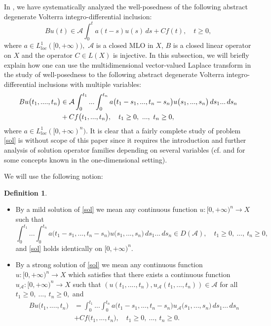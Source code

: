 \documentclass{amsart}
\theoremstyle{definition}
\newtheorem{defn}[thm]{Definition}
\theoremstyle{remark}
\numberwithin{equation}{section}
\begin{document}
In \cite[Chapter 3]{FKP}, we have systematically analyzed the well-posedness of the following abstract degenerate Volterra integro-differential inclusion:
$$
Bu(t)\in {\mathcal A}\int^{t}_{0}a(t-s)u(s)\, ds+Cf(t),\quad t\geq 0,
$$
where $a\in L_{loc}^{1}([0,+\infty)),$ ${\mathcal A}$ is a closed MLO in $X$, $B$ is a closed linear operator on $X$ and the operator $C\in L(X)$ is injective. In this subsection, we will briefly explain how one can use the multidimensional vector-valued Laplace transform in the study of well-posedness to the following abstract degenerate Volterra integro-differential inclusions with multiple variables:
\begin{align}\notag
Bu\bigl(t_{1},....,t_{n}\bigr)&\in {\mathcal A}\int^{t_{1}}_{0}...\int^{t_{n}}_{0}a\bigl(t_{1}-s_{1},...,t_{n}-s_{n}\bigr)u\bigl(s_{1},...,s_{n}\bigr)\, ds_{1} ...\, ds_{n}
\\& \label{sol}+Cf\bigl(t_{1},...,t_{n}\bigr),\quad t_{1}\geq 0,\ ...,\ t_{n}\geq 0,
\end{align}
where $a\in L_{loc}^{1}([0,+\infty)^{n}).$ It is clear that a fairly complete study of problem \eqref{sol} is without scope of this paper since it requires the introduction and further analysis of solution operator families depending on several variables (cf. \cite[Definition 3.2.1]{FKP} and \cite[Definition 7.1.1]{funkcionalne} for some concepts known in the one-dimensional setting).

We will use the following notion:

\begin{defn}\label{labela}
\begin{itemize}
\item[(i)] By a mild solution of \eqref{sol} we mean any continuous function $u : [0,+\infty)^{n} \rightarrow X$ such that 
$$
\int^{t_{1}}_{0}...\int^{t_{n}}_{0}a\bigl(t_{1}-s_{1},...,t_{n}-s_{n}\bigr)u\bigl(s_{1},...,s_{n}\bigr)\, ds_{1} ...\, ds_{n}\in D({\mathcal A}),\quad t_{1}\geq 0,\ ...,\ t_{n}\geq 0,
$$ 
and \eqref{sol} holds identically on $[0,+\infty)^{n}.$
\item[(ii)] By a strong solution of \eqref{sol} we mean any continuous function $u : [0,+\infty)^{n} \rightarrow X$ which satisfies that
there exists a continuous function $u_{{\mathcal A}} : [0,+\infty)^{n} \rightarrow X$ such that $(u(t_{1},....,t_{n}),u_{{\mathcal A}}(t_{1},...,t_{n}))\in {\mathcal A}$ for all $t_{1}\geq 0,\ ...,\ t_{n}\geq 0,$ and
\begin{align*} 
Bu\bigl(t_{1},....,t_{n}\bigr)&=\int^{t_{1}}_{0}...\int^{t_{n}}_{0}a\bigl(t_{1}-s_{1},...,t_{n}-s_{n}\bigr)u_{{\mathcal A}}\bigl(s_{1},...,s_{n}\bigr)\, ds_{1} ...\, ds_{n}
\\& +Cf\bigl(t_{1},...,t_{n}\bigr),\quad t_{1}\geq 0,\ ...,\ t_{n}\geq 0.
\end{align*}
\end{itemize}
\end{defn}
\end{document}
